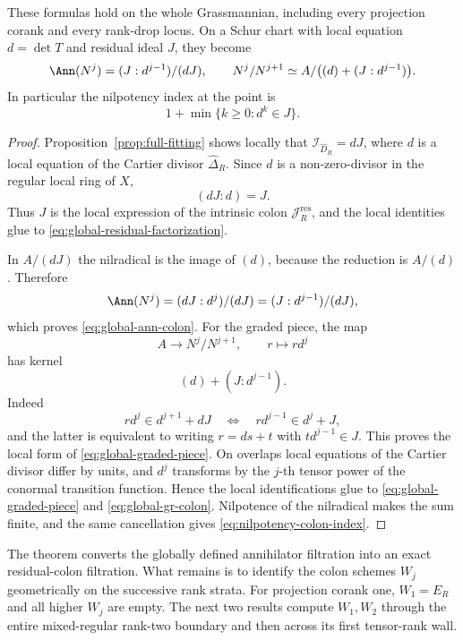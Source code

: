 \begin{theorem}
These formulas hold on the whole Grassmannian, including every
projection corank and every rank-drop locus.  On a Schur chart with
local equation \(d=\det T\) and residual ideal \(J\), they become
\begin{equation}\label{eq:local-colon-filtration}
 \Ann(N^j)=(J:d^{j-1})/(dJ),\qquad
 N^j/N^{j+1}\simeq
 A/\bigl((d)+(J:d^{j-1})\bigr).
\end{equation}
In particular the nilpotency index at the point is
\begin{equation}\label{eq:nilpotency-colon-index}
 1+\min\{k\ge0:d^k\in J\}.
\end{equation}
\end{theorem}

\begin{proof}
Proposition~\ref{prop:full-fitting} shows locally that
\(\mathcal I_{\widehat D_R}=dJ\), where \(d\) is a local equation of
the Cartier divisor \(\widehat\Delta_R\).  Since \(d\) is a
non-zero-divisor in the regular local ring of \(X\),
\[
 (dJ:d)=J.
\]
Thus \(J\) is the local expression of the intrinsic colon
\(\mathcal J_R^{\mathrm{res}}\), and the local identities glue to
\eqref{eq:global-residual-factorization}.

In \(A/(dJ)\) the nilradical is the image of \((d)\), because the
reduction is \(A/(d)\).  Therefore
\[
 \Ann(N^j)
 =
 (dJ:d^j)/(dJ)
 =
 (J:d^{j-1})/(dJ),
\]
which proves \eqref{eq:global-ann-colon}.  For the graded piece, the
map
\[
 A\longrightarrow N^j/N^{j+1},\qquad
 r\longmapsto r d^j
\]
has kernel
\[
 (d)+(J:d^{j-1}).
\]
Indeed
\[
 rd^j\in d^{j+1}+dJ
 \quad\Longleftrightarrow\quad
 rd^{j-1}\in d^j+J,
\]
and the latter is equivalent to writing
\(r=ds+t\) with \(td^{j-1}\in J\).  This proves the local form of
\eqref{eq:global-graded-piece}.  On overlaps local equations of the
Cartier divisor differ by units, and \(d^j\) transforms by the
\(j\)-th tensor power of the conormal transition function.  Hence the
local identifications glue to \eqref{eq:global-graded-piece} and
\eqref{eq:global-gr-colon}.  Nilpotence of the nilradical makes the
sum finite, and the same cancellation gives
\eqref{eq:nilpotency-colon-index}.
\end{proof}

The theorem converts the globally defined annihilator filtration into
an exact residual-colon filtration.  What remains is to identify the
colon schemes \(W_j\) geometrically on the successive rank strata.
For projection corank one, \(W_1=E_R\) and all higher \(W_j\) are
empty.  The next two results compute \(W_1,W_2\) through the entire
mixed-regular rank-two boundary and then across its first tensor-rank
wall.

